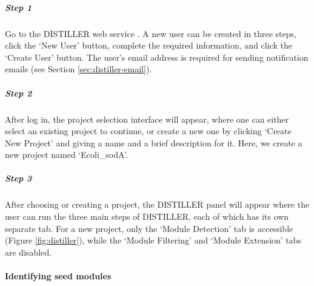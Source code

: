 \begin{small} %

\subparagraph{Step 1}	Go to the DISTILLER web service \cite{DISTILLER}. 
A new user can be created in three steps, click the `New User' button,
complete the required information, and click the `Create User' button.  The
user's email address is required for sending notification emails (see Section
\ref{sec:distiller-email}).

\subparagraph{Step 2}	After log in, the project selection interface will 
appear, where one can either select an existing project to continue, or create
a new one by clicking `Create New Project' and giving a name and a brief
description for it. Here, we create a new project named `Ecoli\_sodA'.

\subparagraph{Step 3}	After choosing or creating a project, the DISTILLER 
panel will appear where the user can run the three main steps of DISTILLER,
each of which has its own separate tab. For a new project, only the `Module
Detection' tab is accessible (Figure \ref{fig:distiller}), while the `Module
Filtering' and `Module Extension' tabs are disabled.

\end{small} %



\paragraph{Identifying seed modules}

